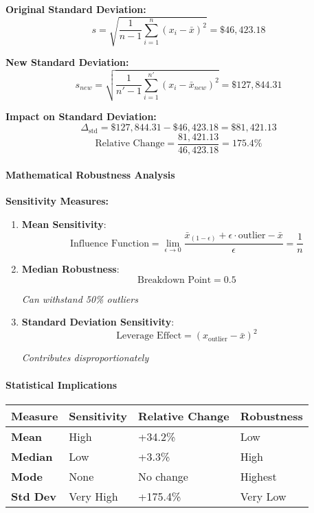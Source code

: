 \documentclass[11pt]{article}
\begin{document}
\textbf{Original Standard Deviation:}
\[s = \sqrt{\frac{1}{n-1}\sum_{i=1}^{n}(x_i - \bar{x})^2} = \$46,423.18\]

\textbf{New Standard Deviation:}
\[s_{new} = \sqrt{\frac{1}{n'-1}\sum_{i=1}^{n'}(x_i - \bar{x}_{new})^2} = \$127,844.31\]

\textbf{Impact on Standard Deviation:}
\[\Delta_{\text{std}} = \$127,844.31 - \$46,423.18 = \$81,421.13\]
\[\text{Relative Change} = \frac{81,421.13}{46,423.18} = 175.4\%\]

\paragraph{Mathematical Robustness
Analysis}\label{mathematical-robustness-analysis}

\textbf{Sensitivity Measures:}

\begin{enumerate}
\def\labelenumi{\arabic{enumi}.}
\item
  \textbf{Mean Sensitivity}:
  \[\text{Influence Function} = \lim_{\epsilon \to 0} \frac{\bar{x}_{(1-\epsilon)} + \epsilon \cdot \text{outlier} - \bar{x}}{\epsilon} = \frac{1}{n}\]
\item
  \textbf{Median Robustness}: \[\text{Breakdown Point} = 0.5\]

  \emph{Can withstand 50\% outliers}
\item
  \textbf{Standard Deviation Sensitivity}:
  \[\text{Leverage Effect} = (x_{\text{outlier}} - \bar{x})^2\]

  \emph{Contributes disproportionately}
\end{enumerate}

\paragraph{Statistical Implications}\label{statistical-implications}

\begin{longtable}[]{@{}llll@{}}
\toprule\noalign{}
\textbf{Measure} & \textbf{Sensitivity} & \textbf{Relative Change} &
\textbf{Robustness} \\
\midrule\noalign{}
\endhead
\bottomrule\noalign{}
\endlastfoot
\textbf{Mean} & High & +34.2\% & Low \\
\textbf{Median} & Low & +3.3\% & High \\
\textbf{Mode} & None & No change & Highest \\
\textbf{Std Dev} & Very High & +175.4\% & Very Low \\
\end{longtable}
\end{document}
